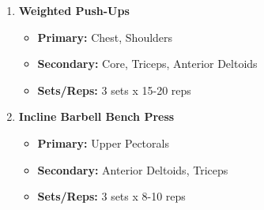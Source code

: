 \documentclass{article}
\begin{document}
\begin{enumerate}[label=\arabic*., wide=0pt, leftmargin=*]
    \item \textbf{Weighted Push-Ups}
        \begin{itemize}[label=\textbullet, leftmargin=*, nosep, topsep=0pt, partopsep=0pt]
            \item \textbf{Primary:} Chest, Shoulders
            \item \textbf{Secondary:} Core, Triceps, Anterior Deltoids
            \item \textbf{Sets/Reps:} 3 sets x 15-20 reps
        \end{itemize}

    \item \textbf{Incline Barbell Bench Press}
        \begin{itemize}[label=\textbullet, leftmargin=*, nosep, topsep=0pt, partopsep=0pt]
            \item \textbf{Primary:} Upper Pectorals
            \item \textbf{Secondary:} Anterior Deltoids, Triceps
            \item \textbf{Sets/Reps:} 3 sets x 8-10 reps
        \end{itemize}
\end{enumerate}
\end{document}
